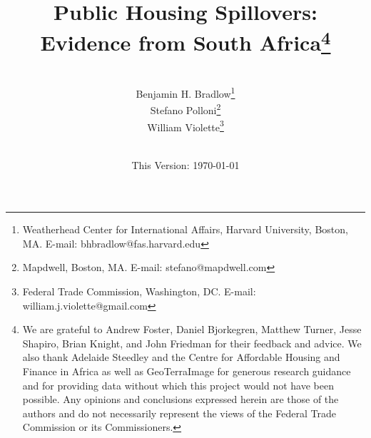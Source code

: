 \documentclass[12pt]{article}
\begin{document}
\begin{titlepage} 
\title{{Public Housing Spillovers:  Evidence from South Africa}\thanks{We are grateful to Andrew Foster, Daniel Bjorkegren, Matthew Turner, Jesse Shapiro, Brian Knight, and John Friedman for their feedback and advice.  We also thank Adelaide Steedley and the Centre for Affordable Housing and Finance in Africa as well as GeoTerraImage for generous research guidance and for providing data without which this project would not have been possible.  Any opinions and conclusions expressed herein are those of the authors and do not necessarily represent the views of the Federal Trade Commission or its Commissioners.}}
\author{\\[3em] Benjamin H. Bradlow\thanks{Weatherhead Center for International Affairs, Harvard University, Boston, MA.  E-mail: bhbradlow@fas.harvard.edu}\\
 Stefano Polloni\thanks{Mapdwell, Boston, MA.   E-mail: stefano@mapdwell.com}\\ 
  William Violette\thanks{Federal Trade Commission, Washington, DC. E-mail: william.j.violette@gmail.com} \\
 \\ 
  }
\date{\vspace{5mm}This Version: \today}
\maketitle
\begin{abstract}









\end{abstract}
\end{titlepage}
\end{document}

